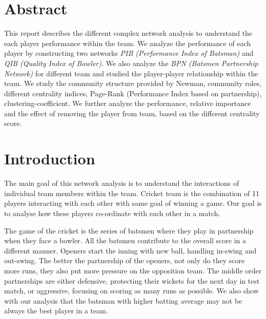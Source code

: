 \documentclass{article}
\begin{document}

\vspace{0.25cm}

\section{Abstract}
This report describes the different complex network analysis to understand the each player performance within the team. We analyze the performance of each player by constructing two networks \textit{PIB (Performance Index of Batsman)} and \textit{QIB (Quality Index of Bowler)}. We also analyze the \textit{BPN (Batsmen Partnership Network)} for different team and studied the player-player relationship within the team. We study the community structure provided by Newman, community roles, different centrality indices, Page-Rank (Performance Index based on partnership), clustering-coefficient. We further analyze the performance, relative importance and the effect of removing the player from team, based on the different centrality score.

\section{Introduction}
The main goal of this network analysis is to understand the interactions of individual team members within the team. Cricket team is the combination of 11 players interacting with each other with same goal of winning a game. Our goal is to analyse how these players co-ordinate with each other in a match.

The game of the cricket is the series of batsmen where they play in partnership when they face a bowler. All the batsmen contribute to the overall score in a different manner. Openers start the inning with new ball, handling in-swing and out-swing. The better the partnership of the openers, not only do they score more runs, they also put more pressure on the opposition team. The middle order partnerships are either defensive, protecting their wickets for the next day in test match, or aggressive, focusing on scoring as many runs as possible. We also show with our analysis that the batsman with higher batting average may not be always the best player in a team.
\end{document}
